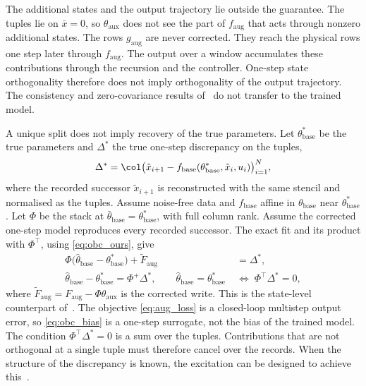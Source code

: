 The additional states and the output trajectory lie outside the guarantee.
The tuples lie on $\bar x=0$, so $\theta_{\mathrm{aux}}$ does not see the part
of $f_{\mathrm{aug}}$ that acts through nonzero additional states.
The rows $g_{\mathrm{aug}}$ are never corrected.
They reach the physical rows one step later through $f_{\mathrm{aug}}$.
The output over a window accumulates these contributions through the
recursion and the controller.
One-step state orthogonality therefore does not imply orthogonality of the
output trajectory.
The consistency and zero-covariance results
of~\cite[Thms.~16, 18]{gyorok2026obc} do not transfer to the trained model.

A unique split does not imply recovery of the true parameters.
Let $\theta^*_{\mathrm{base}}$ be the true parameters and $\Delta^*$ the true
one-step discrepancy on the tuples,
\begin{equation}
 \Delta^*=\col\bigl(\tilde x_{i+1}-f_{\mathrm{base}}(\theta^*_{\mathrm{base}},
 \tilde x_i,u_i)\bigr)_{i=1}^{N},
\label{eq:obc_delta}
\end{equation}
where the recorded successor $\tilde x_{i+1}$ is reconstructed with the same
stencil and normalised as the tuples.
Assume noise-free data and $f_{\mathrm{base}}$ affine in
$\theta_{\mathrm{base}}$ near $\theta^*_{\mathrm{base}}$.
Let $\Phi$ be the stack at
$\bar\theta_{\mathrm{base}}=\theta^*_{\mathrm{base}}$, with full column rank.
Assume the corrected one-step model reproduces every recorded successor.
The exact fit and its product with $\Phi^\top$, using \eqref{eq:obc_ours},
give
\begin{equation}
\begin{aligned}
 \Phi\bigl(\hat\theta_{\mathrm{base}}-\theta^*_{\mathrm{base}}\bigr)
 +\widetilde F_{\mathrm{aug}}&=\Delta^*,\\
 \hat\theta_{\mathrm{base}}-\theta^*_{\mathrm{base}}=\Phi^{+}\Delta^*,
 \qquad
 \hat\theta_{\mathrm{base}}=\theta^*_{\mathrm{base}}
 \;&\Longleftrightarrow\;
 \Phi^\top\Delta^*=0,
\end{aligned}
\label{eq:obc_bias}
\end{equation}
where $\widetilde F_{\mathrm{aug}}=F_{\mathrm{aug}}-\Phi\theta_{\mathrm{aux}}$
is the corrected write.
This is the state-level counterpart
of~\cite[Thm.~7, Eq.~(21)]{gyorok2026obc}.
The objective \eqref{eq:aug_loss} is a closed-loop multistep output error, so
\eqref{eq:obc_bias} is a one-step surrogate, not the bias of the trained model.
The condition $\Phi^\top\Delta^*=0$ is a sum over the tuples.
Contributions that are not orthogonal at a single tuple must therefore cancel
over the records.
When the structure of the discrepancy is known, the excitation can be
designed to achieve this~\cite[Remark~5]{gyorok2026obc}.

